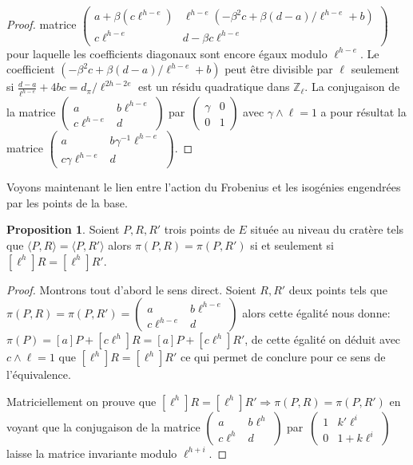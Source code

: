 \documentclass[10pt,a4paper]{book}
\theoremstyle{plain}
\theoremstyle{definition}
\theoremstyle{definition}
\theoremstyle{definition}
\newtheorem{prop}[thm]{Proposition}
\theoremstyle{definition}
\theoremstyle{remark}
\theoremstyle{remark}
\theoremstyle{definition}
\begin{document}
\begin{proof}
matrice $\left ( \begin{smallmatrix}a + \beta (c\ell^{h-e}) & \ell^{h-e}(
-\beta^2c + \beta(d-a)/\ell^{h-e} + b)\\c\ell^{h-e} & d - \beta c\ell^{h-e}
\end{smallmatrix}\right )$ pour laquelle les coefficients diagonaux sont encore
égaux modulo $\ell^{h-e}$. Le coefficient $(-\beta^2c + \beta(d-a)/
\ell^{h-e} + b)$ peut être divisible par $\ell$ seulement si $\frac{d-a}{\ell^{h-e}}+4bc=
d_{\pi}/{\ell^{2h-2e}}$ est un résidu quadratique dans $\mathbb{Z}_{\ell}$. 
La conjugaison de la matrice $\left ( \begin{smallmatrix}a & b\ell^{h-e}\\c\ell^{h-e} & d
\end{smallmatrix}\right )$ par~$\left ( \begin{smallmatrix} \gamma & 0 \\0 & 1
\end{smallmatrix} \right )$ avec $\gamma \wedge \ell=1$  a pour résultat la 
matrice $\left ( \begin{smallmatrix}a  & b\gamma^{-1} \ell^{h-e} \\c \gamma 
\ell^{h-e} & d \end{smallmatrix}\right )$.
\end{proof}

Voyons maintenant le lien entre l'action du Frobenius et les isogénies engendrées par les points de la base.

\begin{prop}
\label{pro:atk:equi}
Soient $P,R,R'$ trois points de $E$ située au niveau du cratère tels que $\langle 
P,R \rangle = \langle P,R' \rangle$ alors $\pi(P,R)=\pi(P,R') $ si et seulement
si $[\ell^{h}]R=[\ell^{h}]R'$.
\end{prop}

\begin{proof}
Montrons tout d'abord le sens direct.
Soient $R,R'$ deux points tels que $\pi(P,R)=\pi(P,R')=\left ( 
\begin{smallmatrix}a & b\ell^{h-e}\\c\ell^{h-e} & d \end{smallmatrix}\right )$ 
alors cette égalité nous donne:
 $\pi(P)=[a]P+[c\ell^{h}]R=[a]P+[c\ell^{h}]R'$, de
cette égalité on déduit avec $c \wedge \ell = 1$ que $[\ell^{h}]R=
[\ell^{h}]R'$ ce qui permet de conclure pour ce sens de l'équivalence.

Matriciellement on prouve que $[\ell^{h}]R=[\ell^{h}]R' \Rightarrow 
\pi(P,R)=\pi(P,R')$ en voyant que la conjugaison de la 
matrice $\left ( \begin{smallmatrix}a & b\ell^{h}\\c\ell^{h} & d
\end{smallmatrix}\right )$ par~$\left ( \begin{smallmatrix}1 & k' \ell^i \\
0 & 1 + k \ell^i \end{smallmatrix} \right )$  laisse la matrice invariante 
modulo $\ell^{h+i}$.
\end{proof}
\end{document}
